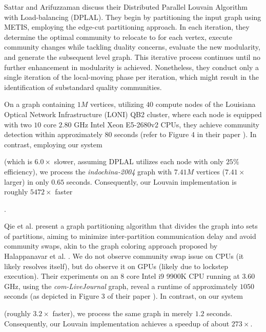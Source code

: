 Sattar and Arifuzzaman \cite{sattar2022scalable} discuss their Distributed Parallel Louvain Algorithm with Load-balancing (DPLAL). They begin by partitioning the input graph using METIS, employing the edge-cut partitioning approach. In each iteration, they determine the optimal community to relocate to for each vertex, execute community changes while tackling duality concerns, evaluate the new modularity, and generate the subsequent level graph. This iterative process continues until no further enhancement in modularity is achieved. Nonetheless, they conduct only a single iteration of the local-moving phase per iteration, which might result in the identification of substandard quality communities. On a graph containing $1M$ vertices, utilizing $40$ compute nodes of the Louisiana Optical Network Infrastructure (LONI) QB2 cluster, where each node is equipped with two $10$ core $2.80$ GHz Intel Xeon E5-2680v2 CPUs, they achieve community detection within approximately $80$ seconds (refer to Figure 4 in their paper \cite{sattar2022scalable}). In contrast, employing our system (which is $6.0\times$ slower, assuming DPLAL utilizes each node with only $25\%$ efficiency), we process the \textit{indochina-2004} graph with $7.41M$ vertices ($7.41\times$ larger) in only $0.65$ seconds. Consequently, our Louvain implementation is roughly $5472\times$ faster.

Qie et al. \cite{qie2022isolate} present a graph partitioning algorithm that divides the graph into sets of partitions, aiming to minimize inter-partition communication delay and avoid community swaps, akin to the graph coloring approach proposed by Halappanavar et al. \cite{com-halappanavar17}. We do not observe community swap issue on CPUs (it likely resolves itself), but do observe it on GPUs (likely due to lockstep execution). Their experiments on an $8$ core Intel i9 9900K CPU running at $3.60$ GHz, using the \textit{com-LiveJournal} graph, reveal a runtime of approximately $1050$ seconds (as depicted in Figure 3 of their paper \cite{qie2022isolate}). In contrast, on our system (roughly $3.2\times$ faster), we process the same graph in merely $1.2$ seconds. Consequently, our Louvain implementation achieves a speedup of about $273\times$.

